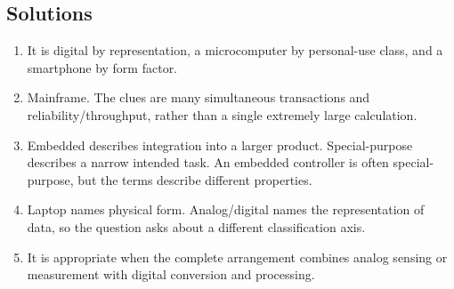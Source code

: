 \documentclass[11pt]{article}
\begin{document}
\subsection*{Solutions}
\begingroup\small
\begin{enumerate}[label=\arabic*.]
  \item It is digital by representation, a microcomputer by personal-use
    class, and a smartphone by form factor.
  \item Mainframe. The clues are many simultaneous transactions and
    reliability/throughput, rather than a single extremely large calculation.
  \item Embedded describes integration into a larger product. Special-purpose
    describes a narrow intended task. An embedded controller is often
    special-purpose, but the terms describe different properties.
  \item Laptop names physical form. Analog/digital names the representation
    of data, so the question asks about a different classification axis.
  \item It is appropriate when the complete arrangement combines analog
    sensing or measurement with digital conversion and processing.
\end{enumerate}
\endgroup
\end{document}
